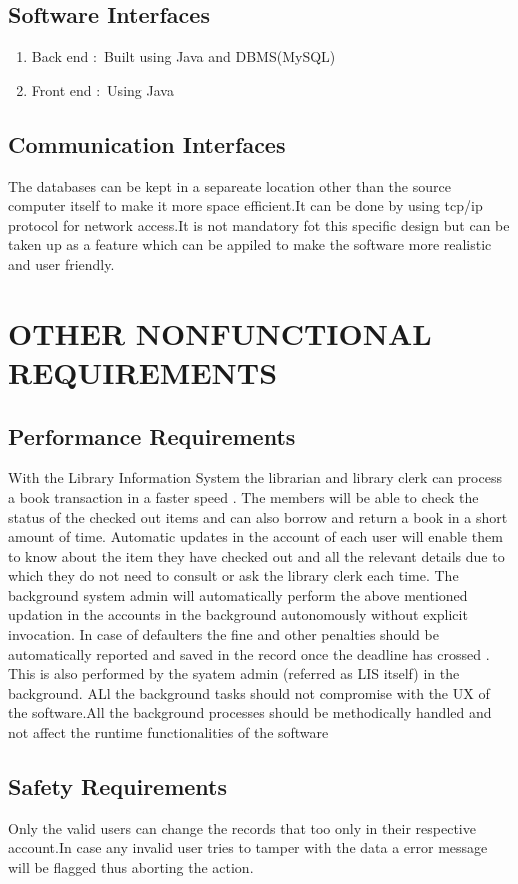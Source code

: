 \documentclass{article}
\begin{document}
\subsection{Software Interfaces}
\begin{enumerate}
\item Back end  $:$ Built using Java and DBMS(MySQL)
\item Front end $:$ Using Java 
\end{enumerate}

\subsection{Communication Interfaces}
The databases can be kept in a separeate location other than the source computer itself to make it more space efficient.It can be done by using tcp/ip protocol for network access.It is not mandatory fot this specific design but can be taken up as a  feature which can be appiled to make the software more realistic and user friendly.

\section{OTHER NONFUNCTIONAL REQUIREMENTS}
\subsection{Performance Requirements}
With the Library Information System the librarian and library clerk can process a book transaction in a faster speed .
The members will be able to check the status of the checked out items and can also borrow and return a book in a short amount of time.
Automatic updates in the account of each user will enable them to know about the item they have checked out and all the relevant details due to which they do not need to consult or ask the library clerk each time.
The background system admin will automatically perform the above mentioned updation in the accounts in the background autonomously without explicit invocation.
In case of defaulters the fine and other penalties should be automatically reported and saved in the record once the deadline has crossed . This is also performed by the syatem admin (referred as LIS itself) in the background.
ALl the background tasks should not compromise with the UX of the software.All the background processes should be methodically handled and not affect the runtime functionalities of the software

\subsection{Safety Requirements}
Only the valid users can change the records that too only in their respective account.In case any invalid user tries to tamper with the data a error message will be flagged thus aborting the action.
\end{document}
